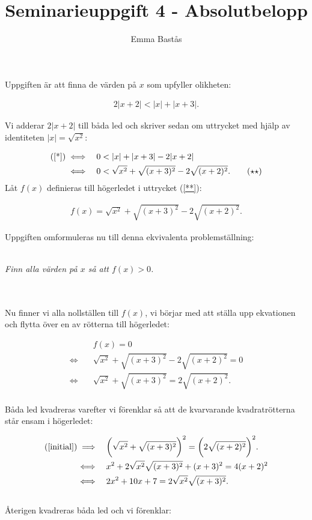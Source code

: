 \documentclass{article}
\title{Seminarieuppgift 4 - Absolutbelopp}
\author{Emma Bastås}
\begin{document}
\maketitle

\noindent Uppgiften är att finna de värden på $x$ som upfyller olikheten:

\begin{gather*}
  2|x+2| < |x| + |x+3|\text{.} \label{*}\tag{$\star$}
\end{gather*}

\noindent Vi adderar $2|x+2|$ till båda led och skriver sedan om uttrycket med hjälp av identiteten $|x| = \sqrt{x^{2}}$:

\begin{align*}
  \text{(\ref{*})} \iff& \quad 0 < |x| + |x + 3| - 2|x+2| \\
  \iff& \quad 0 < \sqrt{x^{2}} + \sqrt{(x + 3)^{2}} - 2 \sqrt{(x + 2)^{2}}\text{.} \label{**}\tag{$\star\star$}
\end{align*}
\noindent Låt $f(x)$ definieras till högerledet i uttrycket (\ref{**}):

\begin{gather*}
  f(x) =  \sqrt{x^{2}} + \sqrt{(x + 3)^{2}} - 2 \sqrt{(x + 2)^{2}}\text{.}
\end{gather*}

\noindent Uppgiften omformuleras nu till denna ekvivalenta problemställning:
\\
\\
\centerline{\emph{Finn alla värden på $x$ så att $f(x) > 0$.}}
\\
\\
Nu finner vi alla nollställen till $f(x)$, vi börjar med att ställa upp ekvationen och flytta över en av rötterna till högerledet:

\begin{align}
  \quad & f(x) = 0 \nonumber\\
  \iff \quad &\sqrt{x^{2}} + \sqrt{(x + 3)^{2}} - 2 \sqrt{(x + 2)^{2}} = 0 \nonumber\\
  \iff \quad &\sqrt{x^{2}} + \sqrt{(x + 3)^{2}} = 2 \sqrt{(x + 2)^{2}}\text{.} \label{initial}
\end{align}
\\
Båda led kvadreras varefter vi förenklar så att de kvarvarande kvadratrötterna står ensam i högerledet:

\begin{align}
  \text{(\ref{initial})} \implies \quad & \biggl(\sqrt{x^{2}} + \sqrt{(x + 3)^{2}}\biggr)^{2} = \biggl(2 \sqrt{(x + 2)^{2}}\biggr)^{2}\text{.} \nonumber\\
  \iff \quad & x^{2} + 2\sqrt{x^{2}}\sqrt{(x+3)^{2}} + (x + 3)^{2} = 4(x+2)^{2} \nonumber\\
  \iff \quad & 2x^{2} + 10x + 7 = 2\sqrt{x^{2}}\sqrt{(x+3)^{2}}\text{.} \label{squared}
\end{align}
\\
Återigen kvadreras båda led och vi förenklar:
\end{document}
